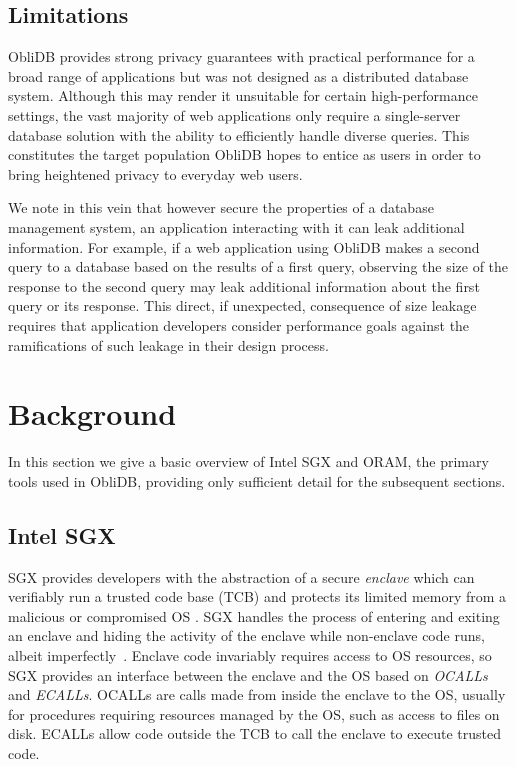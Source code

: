 \documentclass[letterpaper,twocolumn,10pt]{article}
\def\name/{ObliDB}
\begin{document}
\subsection{Limitations}
\name/ provides strong privacy guarantees with practical performance for a broad range of applications but was not designed as a distributed database system. Although this may render it unsuitable for certain high-performance settings, the vast majority of web applications only require a single-server database solution with the ability to efficiently handle diverse queries. This constitutes the target population \name/ hopes to entice as users in order to bring heightened privacy to everyday web users. 

We note in this vein that however secure the properties of a database management system, an application interacting with it can leak additional information. For example, if a web application using \name/ makes a second query to a database based on the results of a first query, observing the size of the response to the second query may leak additional information about the first query or its response. This direct, if unexpected, consequence of size leakage requires that application developers consider performance goals against the ramifications of such leakage in their design process.

\section{Background}\label{background}
In this section we give a basic overview of Intel SGX and ORAM, the primary tools used in \name/, providing only sufficient detail for the subsequent sections.

\subsection{Intel SGX}

SGX provides developers with the abstraction of a secure \textit{enclave} which can verifiably run a trusted code base (TCB) and protects its limited memory from a malicious or compromised OS \cite{CD16, SGXRef}. SGX handles the process of entering and exiting an enclave and hiding the activity of the enclave while non-enclave code runs, albeit imperfectly~\cite{LSG+16}. Enclave code invariably requires access to OS resources, so SGX provides an interface between the enclave and the OS based on \textit{OCALLs} and \textit{ECALLs}. OCALLs are calls made from inside the enclave to the OS, usually for procedures requiring resources managed by the OS, such as access to files on disk. ECALLs allow code outside the TCB to call the enclave to execute trusted code.
\end{document}

